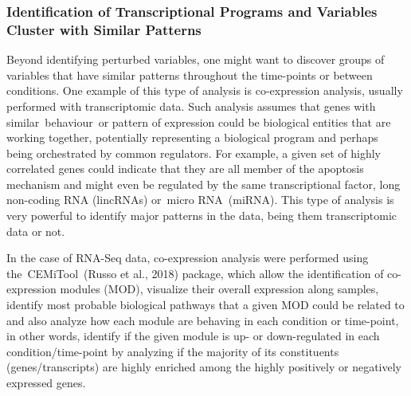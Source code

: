 \documentclass[
]{book}
\begin{document}
\hypertarget{identification-of-transcriptional-programs-and-variables-cluster-with-similar-patterns}{%
\subsubsection{Identification of Transcriptional Programs and Variables Cluster with Similar Patterns}\label{identification-of-transcriptional-programs-and-variables-cluster-with-similar-patterns}}

Beyond identifying perturbed variables, one might want to discover groups of variables that have similar patterns throughout the time-points or between conditions. One example of this type of analysis is co-expression analysis, usually performed with transcriptomic data. Such analysis assumes that genes with similar~behaviour~or pattern of expression could be biological entities that are working together, potentially representing a biological program and perhaps being orchestrated by common regulators. For example, a given set of highly correlated genes could indicate that they are all member of the apoptosis mechanism and might even be regulated by the same transcriptional factor, long non-coding RNA (lincRNAs) or~micro RNA~(miRNA). This type of analysis is very powerful to identify major patterns in the data, being them transcriptomic data or not.

In the case of RNA-Seq data, co-expression analysis were performed using the~CEMiTool~(Russo et al., 2018)⁠ package, which allow the identification of co-expression modules (MOD), visualize their overall expression along samples, identify most probable biological pathways that a given MOD could be related to and also analyze how each module are behaving in each condition or time-point, in other words, identify if the given module is up- or down-regulated in each condition/time-point by analyzing if the majority of its constituents (genes/transcripts) are highly enriched among the highly positively or negatively expressed genes.
\end{document}
